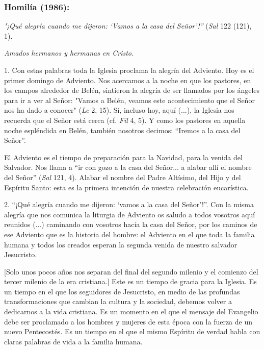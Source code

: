 \subsubsection{Homilía (1986): }


\begin{body} 
	\emph{"¡Qué alegría cuando me dijeron: `Vamos a la casa del Señor'!''} (\emph{Sal} 122 (121), 1).
	
	\emph{Amados hermanos y hermanas en Cristo.}
	
	1. Con estas palabras toda la Iglesia proclama la alegría del Adviento. Hoy es el primer domingo de Adviento. Nos acercamos a la noche en que los pastores, en los campos alrededor de Belén, sintieron la alegría de ser llamados por los ángeles para ir a ver al Señor: "Vamos a Belén, veamos este acontecimiento que el Señor nos ha dado a conocer" (\emph{Lc} 2, 15). Sí, incluso hoy, aquí (...), la Iglesia nos recuerda que el Señor está cerca (cf. \emph{Fil} 4, 5). Y como los pastores en aquella noche espléndida en Belén, también nosotros decimos: ``Iremos a la casa del Señor''.
	
	El Adviento es el tiempo de preparación para la Navidad, para la venida del Salvador. Nos llama a ``ir con gozo a la casa del Señor... a alabar allí el nombre del Señor'' (\emph{Sal} 121, 4). Alabar el nombre del Padre Altísimo, del Hijo y del Espíritu Santo: esta es la primera intención de nuestra celebración eucarística.
	
	2. ``¡Qué alegría cuando me dijeron: `vamos a la casa del Señor'!''. Con la misma alegría que nos comunica la liturgia de Adviento os saludo a todos vosotros aquí reunidos (...) caminando con vosotros hacia la casa del Señor, por los caminos de ese Adviento que es la historia del hombre: el Adviento en el que toda la familia humana y todos los creados esperan la segunda venida de nuestro salvador Jesucristo.
	
	{[}Solo unos pocos años nos separan del final del segundo milenio y el comienzo del tercer milenio de la era cristiana.{]} Este es un tiempo de gracia para la Iglesia. Es un tiempo en el que los seguidores de Jesucristo, en medio de las profundas transformaciones que cambian la cultura y la sociedad, debemos volver a dedicarnos a la vida cristiana. Es un momento en el que el mensaje del Evangelio debe ser proclamado a los hombres y mujeres de esta época con la fuerza de un nuevo Pentecostés. Es un tiempo en el que el mismo Espíritu de verdad habla con claras palabras de vida a la familia humana.
	

\end{body}
